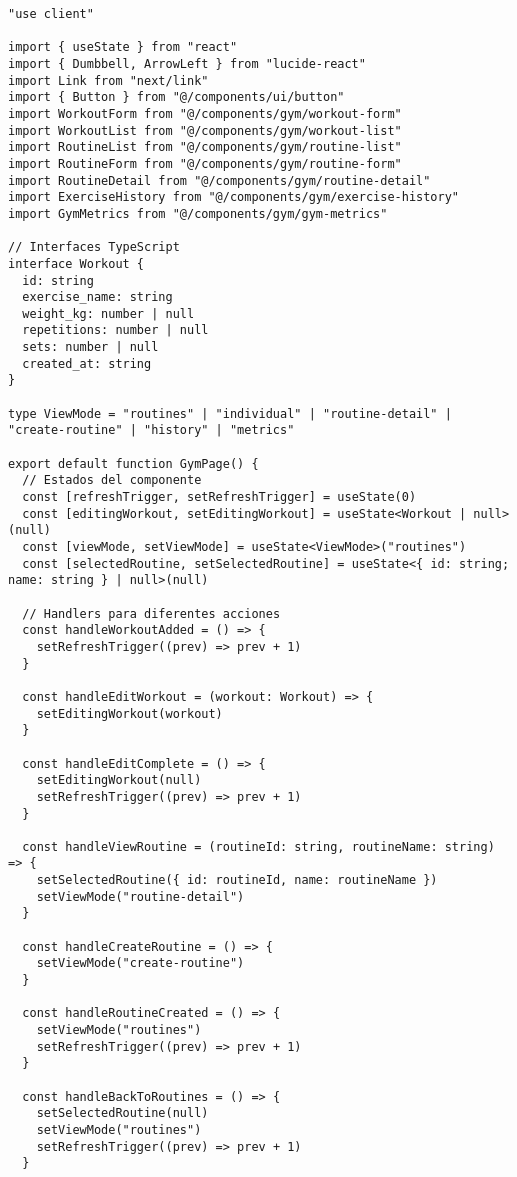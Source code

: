 \documentclass[12pt,a4paper]{article}
\begin{document}
\begin{lstlisting}[caption=app/gym/page.tsx - Estructura completa]
"use client"

import { useState } from "react"
import { Dumbbell, ArrowLeft } from "lucide-react"
import Link from "next/link"
import { Button } from "@/components/ui/button"
import WorkoutForm from "@/components/gym/workout-form"
import WorkoutList from "@/components/gym/workout-list"
import RoutineList from "@/components/gym/routine-list"
import RoutineForm from "@/components/gym/routine-form"
import RoutineDetail from "@/components/gym/routine-detail"
import ExerciseHistory from "@/components/gym/exercise-history"
import GymMetrics from "@/components/gym/gym-metrics"

// Interfaces TypeScript
interface Workout {
  id: string
  exercise_name: string
  weight_kg: number | null
  repetitions: number | null
  sets: number | null
  created_at: string
}

type ViewMode = "routines" | "individual" | "routine-detail" | "create-routine" | "history" | "metrics"

export default function GymPage() {
  // Estados del componente
  const [refreshTrigger, setRefreshTrigger] = useState(0)
  const [editingWorkout, setEditingWorkout] = useState<Workout | null>(null)
  const [viewMode, setViewMode] = useState<ViewMode>("routines")
  const [selectedRoutine, setSelectedRoutine] = useState<{ id: string; name: string } | null>(null)

  // Handlers para diferentes acciones
  const handleWorkoutAdded = () => {
    setRefreshTrigger((prev) => prev + 1)
  }

  const handleEditWorkout = (workout: Workout) => {
    setEditingWorkout(workout)
  }

  const handleEditComplete = () => {
    setEditingWorkout(null)
    setRefreshTrigger((prev) => prev + 1)
  }

  const handleViewRoutine = (routineId: string, routineName: string) => {
    setSelectedRoutine({ id: routineId, name: routineName })
    setViewMode("routine-detail")
  }

  const handleCreateRoutine = () => {
    setViewMode("create-routine")
  }

  const handleRoutineCreated = () => {
    setViewMode("routines")
    setRefreshTrigger((prev) => prev + 1)
  }

  const handleBackToRoutines = () => {
    setSelectedRoutine(null)
    setViewMode("routines")
    setRefreshTrigger((prev) => prev + 1)
  }


\end{lstlisting}
\end{document}
